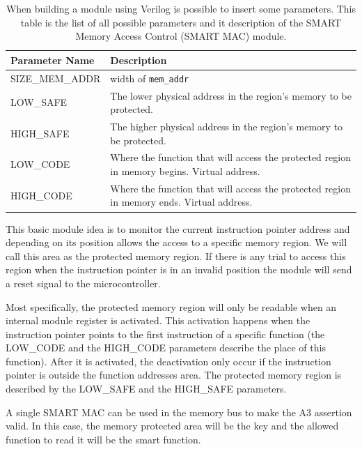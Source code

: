 \begin{table}
	\begin{center}
		\begin{tabular}{|p{4cm}|p{10cm}|}
			\hline 
			\textbf{Parameter Name} & \textbf{Description} \\
			\hline 
			SIZE\_MEM\_ADDR & width of \verb|mem_addr| \\ 
			\hline 
			LOW\_SAFE &  The lower physical address in the region's memory to be protected.\\ 
			\hline 
			HIGH\_SAFE & The higher physical address in the region's memory to be protected. \\ 
			\hline 
			LOW\_CODE & Where the function that will access the protected region in memory begins. Virtual address. \\ 
			\hline 
			HIGH\_CODE & Where the function that will access the protected region in memory ends. Virtual address. \\ 
			\hline 
		\end{tabular}
	\end{center}
	\caption{When building a module using Verilog is possible to insert some parameters. This table is the list of all possible parameters and it description of the SMART Memory Access Control (SMART MAC) module.}
	\label{table:smart_mac_parans}
\end{table}

This basic module idea is to monitor the current instruction pointer address and depending on its position allows the access to a specific memory region. We will call this area as the protected memory region. If there is any trial to access this region when the instruction pointer is in an invalid position the module will send a reset signal to the microcontroller.

Most specifically, the protected memory region will only be readable when an internal module register is activated.  This activation happens when the instruction pointer points to the first instruction of a specific function (the LOW\_CODE and the HIGH\_CODE parameters describe the place of this function). After it is activated, the deactivation only occur if the instruction pointer is outside the function addresses area. The protected memory region is described by the LOW\_SAFE and the HIGH\_SAFE parameters.

A single SMART MAC can be used in the memory bus to make the A3 assertion valid. In this case, the memory protected area will be the key and the allowed function to read it will be the smart function.


